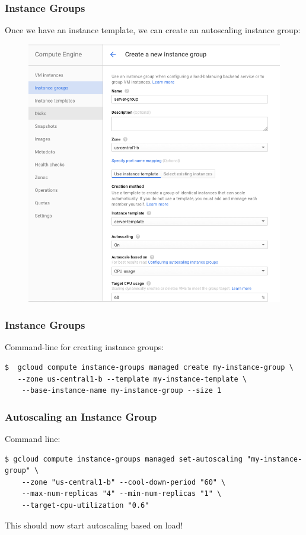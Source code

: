 \documentclass[9pt]{beamer}
\begin{document}
\begin{frame}[fragile]
\frametitle{Instance Groups}
Once we have an instance template, we can create an autoscaling instance group:
\begin{figure}
    \includegraphics[scale=0.2]{figures/Autoscale.png}
\end{figure}
\end{frame}

\begin{frame}[fragile]
\frametitle{Instance Groups}
Command-line for creating instance groups:
\begin{verbatim}
$  gcloud compute instance-groups managed create my-instance-group \
   --zone us-central1-b --template my-instance-template \
    --base-instance-name my-instance-group --size 1
\end{verbatim}
\end{frame}

\begin{frame}[fragile]
\frametitle{Autoscaling an Instance Group}
Command line:
\begin{verbatim}
$ gcloud compute instance-groups managed set-autoscaling "my-instance-group" \
    --zone "us-central1-b" --cool-down-period "60" \
    --max-num-replicas "4" --min-num-replicas "1" \
    --target-cpu-utilization "0.6"
\end{verbatim}
This should now start autoscaling based on load!
\end{frame}
\end{document}
